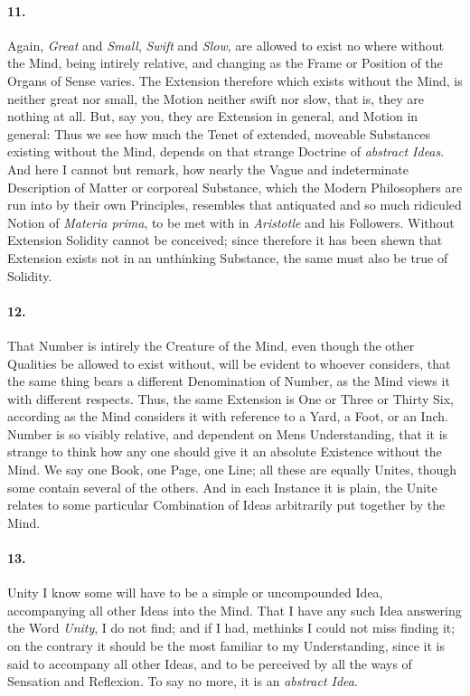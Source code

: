 \documentclass[]{article}
\newenvironment{sectionbody}{\begin{multicols}{2}}{\end{multicols}}
\begin{document}
\begin{sectionbody}
\paragraph{11.} Again, \emph{Great} and \emph{Small}, \emph{Swift} and
\emph{Slow}, are allowed to exist no where without the Mind,
being intirely relative, and changing as the Frame or Position of
the Organs of Sense varies.  The Extension therefore which exists
without the Mind, is neither great nor small, the Motion neither
swift nor slow, that is, they are nothing at all.  But, say you,
they are Extension in general, and Motion in general: Thus we see
how much the Tenet of extended, moveable Substances existing
without the Mind, depends on that strange Doctrine of
\emph{abstract Ideas}.  And here I cannot but remark, how
nearly the Vague and indeterminate Description of Matter or
corporeal Substance, which the Modern Philosophers are run into
by their own Principles, resembles that antiquated and so much
ridiculed Notion of \emph{Materia prima}, to be met with in
\emph{Aristotle} and his Followers.  Without Extension Solidity
cannot be conceived; since therefore it has been shewn that
Extension exists not in an unthinking Substance, the same must
also be true of Solidity.



\paragraph{12.} That Number is intirely the Creature of the Mind, even though the
other Qualities be allowed to exist without, will be evident to
whoever considers, that the same thing bears a different
Denomination of Number, as the Mind views it with different
respects.  Thus, the same Extension is One or Three or Thirty
Six, according as the Mind considers it with reference to a Yard,
a Foot, or an Inch.  Number is so visibly relative, and dependent
on Mens Understanding, that it is strange to think how any one
should give it an absolute Existence without the Mind.  We say
one Book, one Page, one Line; all these are equally Unites,
though some contain several of the others.  And in each Instance
it is plain, the Unite relates to some particular Combination of
Ideas arbitrarily put together by the Mind.



\paragraph{13.} Unity I know some will have to be a simple or uncompounded Idea,
accompanying all other Ideas into the Mind.  That I have any such
Idea answering the Word \emph{Unity}, I do not find; and if I
had, methinks I could not miss finding it; on the contrary it
should be the most familiar to my Understanding, since it is said
to accompany all other Ideas, and to be perceived by all the ways
of Sensation and Reflexion.  To say no more, it is an
\emph{abstract Idea}.




\end{sectionbody}
\end{document}
